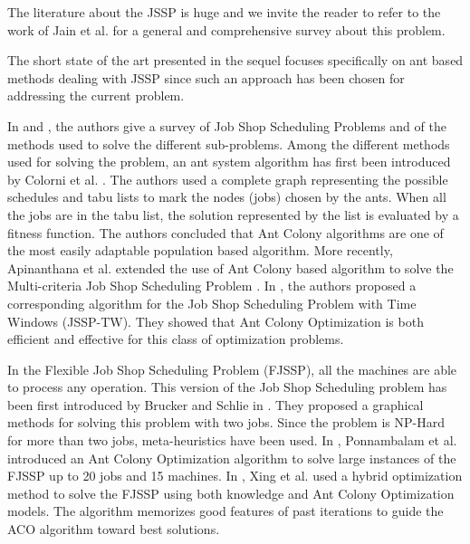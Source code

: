 \documentclass[a4paper,10pt]{article}
\begin{document}
The literature about the JSSP is huge and we invite the reader to refer to the work of Jain et al. \cite{Jain1999} for a general and comprehensive survey about this problem.

The short state of the art presented in the sequel focuses specifically on ant based methods dealing with JSSP since such an approach has been chosen for addressing the current problem.

In \cite{Jain1999} and \cite{Brucker2010}, the authors give a survey of Job Shop Scheduling Problems and of the methods used to solve the different sub-problems.
Among the different methods used for solving the problem, an ant system algorithm has first been introduced by Colorni et al. \cite{Colorni1994}. The authors used a complete graph representing the possible schedules and tabu lists to mark the nodes (jobs) chosen by the ants. When all the jobs are in the tabu list, the solution represented by the list is evaluated by a fitness function. The authors concluded that Ant Colony algorithms are one of the most easily adaptable population based algorithm. More recently, Apinanthana et al. extended the use of Ant Colony based algorithm to solve the Multi-criteria Job Shop Scheduling Problem \cite{Apinanthana2011}.
In \cite{Huang2008}, the authors proposed a corresponding algorithm for the Job Shop Scheduling Problem with Time Windows (JSSP-TW). They showed that Ant Colony Optimization is both efficient and effective for this class of optimization problems.

In the Flexible Job Shop Scheduling Problem (FJSSP), all the machines are able to process any operation. This version of the Job Shop Scheduling problem has been first introduced by Brucker and Schlie in \cite{Brucker1990}. They proposed a graphical methods for solving this problem with two jobs. Since the problem is NP-Hard for more than two jobs, meta-heuristics have been used. In \cite{Ponnambalam2005}, Ponnambalam et al. introduced an Ant Colony Optimization algorithm to solve large instances of the FJSSP up to 20 jobs and 15 machines. In \cite{Xing2010}, Xing et al. used a hybrid optimization method to solve the FJSSP using both knowledge and Ant Colony Optimization models. The algorithm memorizes good features of past iterations to guide the ACO algorithm toward best solutions.
\end{document}

